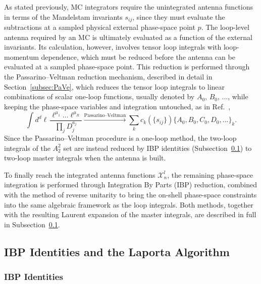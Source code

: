 As stated previously, MC integrators require the unintegrated antenna functions in terms
of the Mandelstam invariants $s_{ij}$, since they must evaluate the subtractions at 
a sampled physical external phase-space point $p$. The loop-level antenna required by 
an MC is ultimately evaluated as a function of the external invariants. Its 
calculation, however, involves tensor loop integrals with loop-momentum dependence, 
which must be reduced before the antenna can be evaluated at a sampled phase-space 
point. This reduction is performed through the Passarino--Veltman reduction
mechanism, described in detail in Section~\ref{subsec:PaVe}, which reduces the
tensor loop integrals to linear combinations of scalar one-loop functions,
usually denoted by $A_0$, $B_0$, ..., while keeping the phase-space variables and integration untouched, as in Ref.~\cite{Passarino:1979pv},
\begin{equation}\label{eq:PaVeSchematic}
    \int d^d\ell\, \frac{\ell^{\mu_1}...\ell^{\mu_R}}{\prod_j D_j^{a_j}} \xrightarrow{\text{Passarino--Veltman}} \sum_k c_k\!\left(\{s_{ij}\}\right)\{A_0,B_0,C_0,D_0,...\}_k.
\end{equation}
Since the Passarino--Veltman procedure is a one-loop method, the two-loop integrals of the
$A_2^2$ set are instead reduced by IBP identities (Subsection~\ref{subsec:ibp}) to two-loop
master integrals when the antenna is built.

To finally reach the integrated antenna functions $\mathcal X_n^l$, the
remaining phase-space integration is performed through Integration By Parts
(IBP) reduction, combined with the method of reverse unitarity to bring the
on-shell phase-space constraints into the same algebraic framework as the loop
integrals. Both methods, together with the resulting Laurent expansion of the
master integrals, are described in full in Subsection~\ref{subsec:ibp}.


\subsection{IBP Identities and the Laporta Algorithm}\label{subsec:ibp}

\subsubsection{IBP Identities}\label{subsubsec:ibpibp}

